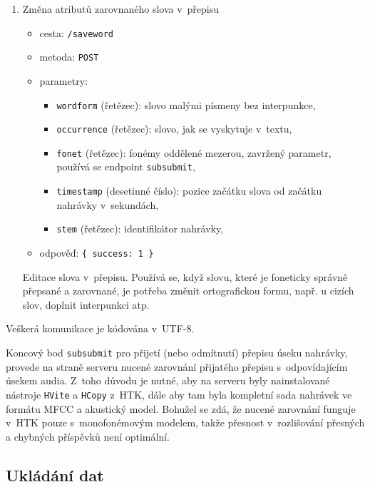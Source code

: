 \begin{enumerate}
{    Tento endpoint momentálně nová verze webového rozhraní nepoužívá, byl
    zamýšlen jako vodítko pro uživatele při výběru nahrávky pro přepis a
    pro navození soutěživého ducha.
}
\item{
    Změna atributů zarovnaného slova v~přepisu \\
    \begin{itemize}
        \item{cesta: \texttt{/saveword}}
        \item{metoda: \texttt{POST}}
        \item{parametry:
            \begin{itemize}
                \item{\texttt{wordform} (řetězec): slovo malými písmeny bez interpunkce,}
                \item{\texttt{occurrence} (řetězec): slovo, jak se vyskytuje v~textu,}
                \item{\texttt{fonet} (řetězec): fonémy oddělené mezerou, zavržený
                parametr, používá se endpoint \texttt{subsubmit},}
                \item{\texttt{timestamp} (desetinné číslo): pozice začátku slova od
                začátku nahrávky v~sekundách,}
                \item{\texttt{stem} (řetězec): identifikátor nahrávky,}
            \end{itemize}
        }
        \item{odpověď: \texttt{\{ success: 1 \}}}
    \end{itemize}
    Editace slova v~přepisu. Používá se, když slovu, které je foneticky správně
    přepsané a zarovnané, je potřeba změnit ortografickou formu, např. u cizích
    slov, doplnit interpunkci atp.
}
\end{enumerate}

Veškerá komunikace je kódována v~UTF-8.

Koncový bod \texttt{subsubmit} pro přijetí (nebo odmítnutí) přepisu úseku
nahrávky, provede na straně serveru nucené zarovnání přijatého přepisu
s~odpovídajícím úsekem audia. Z~toho důvodu je nutné, aby na serveru byly
nainstalované nástroje \texttt{HVite} a \texttt{HCopy} z~HTK, dále aby tam byla
kompletní sada nahrávek ve formátu MFCC a akustický model. Bohužel se zdá, že
nucené zarovnání funguje v~HTK pouze s~monofonémovým modelem, takže přesnost
v~rozlišování přesných a chybných příspěvků není optimální.

\subsection{Ukládání dat}

